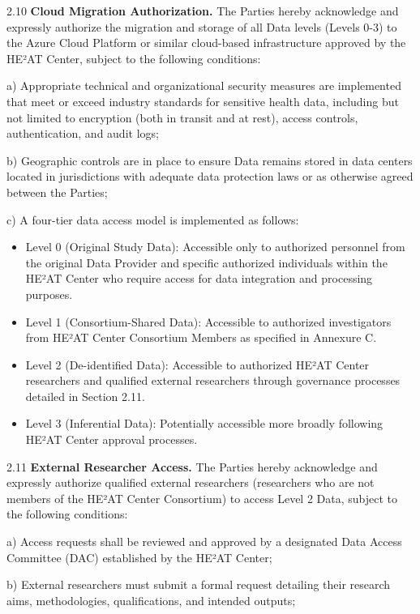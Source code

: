 \documentclass[12pt,letterpaper]{article}
\newcommand{\added}[1]{\textcolor{addcolor}{#1}}
\begin{document}
\added{2.10 \textbf{Cloud Migration Authorization.} The Parties hereby acknowledge and expressly authorize the migration and storage of all Data levels (Levels 0-3) to the Azure Cloud Platform or similar cloud-based infrastructure approved by the HE²AT Center, subject to the following conditions:}

\added{a) Appropriate technical and organizational security measures are implemented that meet or exceed industry standards for sensitive health data, including but not limited to encryption (both in transit and at rest), access controls, authentication, and audit logs;}

\added{b) Geographic controls are in place to ensure Data remains stored in data centers located in jurisdictions with adequate data protection laws or as otherwise agreed between the Parties;}

\added{c) A four-tier data access model is implemented as follows:}
\added{\begin{itemize}
\item Level 0 (Original Study Data): Accessible only to authorized personnel from the original Data Provider and specific authorized individuals within the HE²AT Center who require access for data integration and processing purposes.
\item Level 1 (Consortium-Shared Data): Accessible to authorized investigators from HE²AT Center Consortium Members as specified in Annexure C.
\item Level 2 (De-identified Data): Accessible to authorized HE²AT Center researchers and qualified external researchers through governance processes detailed in Section 2.11.
\item Level 3 (Inferential Data): Potentially accessible more broadly following HE²AT Center approval processes.
\end{itemize}}

\added{2.11 \textbf{External Researcher Access.} The Parties hereby acknowledge and expressly authorize qualified external researchers (researchers who are not members of the HE²AT Center Consortium) to access Level 2 Data, subject to the following conditions:}

\added{a) Access requests shall be reviewed and approved by a designated Data Access Committee (DAC) established by the HE²AT Center;}

\added{b) External researchers must submit a formal request detailing their research aims, methodologies, qualifications, and intended outputs;}
\end{document}
